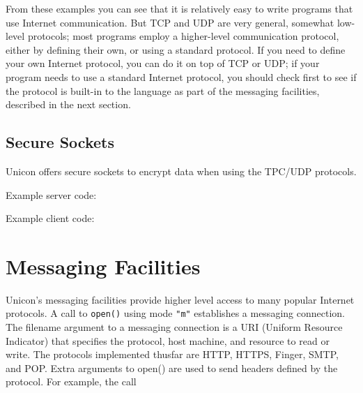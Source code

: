 From these examples you can see that it is relatively easy to write
programs that use Internet communication. But TCP and UDP are very
general, somewhat low-level protocols; most programs employ a
higher-level communication protocol, either by defining their own, or
using a standard protocol. If you need to define your own Internet
protocol, you can do it on top of TCP or UDP; if your program needs to
use a standard Internet protocol, you should check first to see if the
protocol is built-in to the language as part of the messaging
facilities, described in the next section.

\subsection*{Secure Sockets}

Unicon offers secure sockets to encrypt data when using the TPC/UDP protocols.

Example server code:

Example client code:

\section{Messaging Facilities}

Unicon's messaging facilities provide
higher level access to many popular Internet protocols. A call to
\texttt{open()} using mode \texttt{"m"}
establishes a messaging connection. The filename argument to a
messaging connection is a URI (Uniform Resource Indicator) that
specifies the protocol, host machine, and resource to read or write.
The protocols implemented thusfar are HTTP, HTTPS, Finger, SMTP, and POP.
Extra arguments to open() are used to send headers defined by the
protocol. For example, the call

